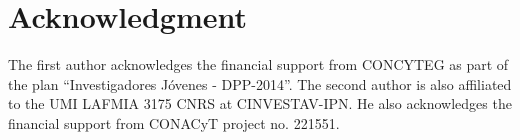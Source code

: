 \documentclass[review,3p]{elsarticle}
\begin{document}



\section*{Acknowledgment}
The first author acknowledges the financial support from CONCYTEG as part of the plan ``Investigadores J\'ovenes - DPP-2014''.
The second author is also affiliated to the
UMI LAFMIA 3175 CNRS at CINVESTAV-IPN.
He also acknowledges the financial support from CONACyT project no. 221551.



\end{document}
